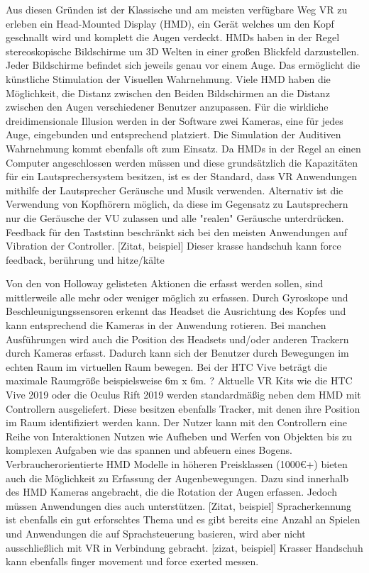 Aus diesen Gründen ist der Klassische und am meisten verfügbare Weg VR zu erleben ein Head-Mounted Display (HMD), ein Gerät welches um den Kopf geschnallt wird und komplett die Augen verdeckt. HMDs haben in der Regel stereoskopische Bildschirme um 3D Welten in einer großen Blickfeld darzustellen. Jeder Bildschirme befindet sich jeweils genau vor einem Auge. Das ermöglicht die künstliche Stimulation der Visuellen Wahrnehmung. Viele HMD haben die Möglichkeit, die Distanz zwischen den Beiden Bildschirmen an die Distanz zwischen den Augen verschiedener Benutzer anzupassen. Für die wirkliche dreidimensionale Illusion werden in der Software zwei Kameras, eine für jedes Auge, eingebunden und entsprechend platziert.
Die Simulation der Auditiven Wahrnehmung kommt ebenfalls oft zum Einsatz. Da HMDs in der Regel an einen Computer angeschlossen werden müssen und diese grundsätzlich die Kapazitäten für ein Lautsprechersystem besitzen, ist es der Standard, dass VR Anwendungen mithilfe der Lautsprecher Geräusche und Musik verwenden. Alternativ ist die Verwendung von Kopfhörern möglich, da diese im Gegensatz zu Lautsprechern nur die Geräusche der VU zulassen und alle "realen" Geräusche unterdrücken.
Feedback für den Taststinn beschränkt sich bei den meisten Anwendungen auf Vibration der Controller. [Zitat, beispiel] 
Dieser krasse handschuh kann force feedback, berührung und hitze/kälte

Von den von Holloway gelisteten Aktionen die erfasst werden sollen, sind mittlerweile alle mehr oder weniger möglich zu erfassen.
Durch Gyroskope und Beschleunigungssensoren erkennt das Headset die Ausrichtung des Kopfes und kann entsprechend die Kameras in der Anwendung rotieren. Bei manchen Ausführungen wird auch die Position des Headsets und/oder anderen Trackern durch Kameras erfasst. Dadurch kann sich der Benutzer durch Bewegungen im echten Raum im virtuellen Raum bewegen. \cite{Boas2012}\cite{Holloway1995} Bei der HTC Vive beträgt die maximale Raumgröße beispielsweise 6m x 6m. ?
Aktuelle VR Kits wie die HTC Vive 2019 oder die Oculus Rift 2019 werden standardmäßig neben dem HMD mit Controllern ausgeliefert. Diese besitzen ebenfalls Tracker, mit denen ihre Position im Raum identifiziert werden kann. Der Nutzer kann mit den Controllern eine Reihe von Interaktionen Nutzen wie Aufheben und Werfen von Objekten bis zu komplexen Aufgaben wie das spannen und abfeuern eines Bogens. 
Verbraucherorientierte HMD Modelle in höheren Preisklassen (1000€+) bieten auch die Möglichkeit  zu Erfassung der Augenbewegungen. Dazu sind innerhalb des HMD Kameras angebracht, die die Rotation der Augen erfassen. Jedoch müssen Anwendungen dies auch unterstützen. [Zitat, beispiel]
Spracherkennung ist ebenfalls ein gut erforschtes Thema und es gibt bereits eine Anzahl an Spielen und Anwendungen die auf Sprachsteuerung basieren, wird aber nicht ausschließlich mit VR in Verbindung gebracht. [zizat, beispiel] 
Krasser Handschuh kann ebenfalls finger movement und force exerted messen.

